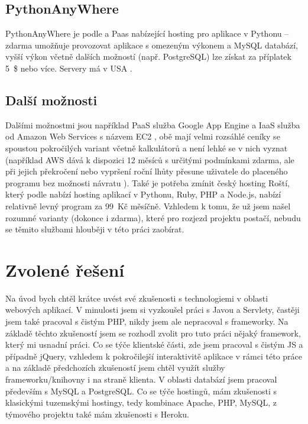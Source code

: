         \subsection{PythonAnyWhere}
        PythonAnyWhere je podle \cite{pythonanywhere1} a \cite{pythonanywhere2} Paas nabízející hosting pro aplikace v Pythonu -- zdarma umožňuje provozovat aplikace s omezeným výkonem a MySQL databází, vyšší výkon včetně dalších možností (např. PostgreSQL) lze získat za příplatek 5~\$ nebo více. Servery má v USA \cite{pythonanywhere3}.
        
        \subsection{Další možnosti}
        Dalšími možnostmi jsou například PaaS služba Google App Engine \cite{googleapp} a IaaS služba od Amazon Web Services s názvem EC2 \cite{aws1}, obě mají velmi rozsáhlé ceníky se spoustou pokročilých variant včetně kalkulátorů a není lehké se v nich vyznat (například AWS dává k dispozici 12 měsíců s určitými podmínkami zdarma, ale při jejich překročení nebo vypršení roční lhůty přesune uživatele do placeného programu bez možnosti návratu \cite{aws2}). Také je potřeba zmínit český hosting Roští, který podle \cite{rosti} nabízí hosting aplikací v Pythonu, Ruby, PHP a Node.js, nabízí relativně levný program za 99~Kč měsíčně. Vzhledem k tomu, že už jsem našel rozumné varianty (dokonce i zdarma), které pro rozjezd projektu postačí, nebudu se těmito službami hlouběji v této práci zaobírat.

    \section{Zvolené řešení}\label{reseni}
    Na úvod bych chtěl krátce uvést své zkušenosti s technologiemi v oblasti webových aplikací. V minulosti jsem si vyzkoušel práci s Javou a Servlety, častěji jsem také pracoval s čistým PHP, nikdy jsem ale nepracoval s frameworky. Na základě těchto zkušeností jsem se rozhodl zvolit pro tuto práci nějaký framework, který mi usnadní práci. Co se týče klientské části, zde jsem pracoval s čistým JS a případně jQuery, vzhledem k pokročilejší interaktivitě aplikace v rámci této práce a na základě předchozích zkušeností jsem chtěl využít služby frameworku/knihovny i na straně klienta. V oblasti databází jsem pracoval především s MySQL a PostgreSQL. Co se týče hostingů, mám zkušenosti s klasickými tuzemskými hostingy, tedy kombinace Apache, PHP, MySQL, z týmového projektu také mám zkušenosti s Heroku.
    
